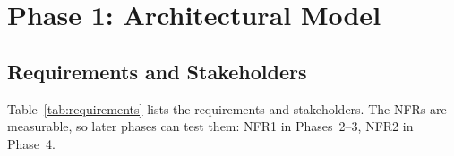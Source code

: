\section{Phase 1: Architectural Model}\label{sec:phase1}

\subsection{Requirements and Stakeholders}
Table~\ref{tab:requirements} lists the requirements and stakeholders. The NFRs
are measurable, so later phases can test them: NFR1 in Phases~2--3, NFR2 in Phase~4.

